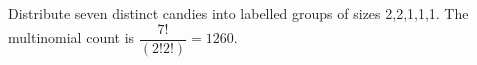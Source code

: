 Distribute seven distinct candies into labelled groups of sizes 2,2,1,1,1. The multinomial count is $\dfrac{7!}{(2!2!)}=\boxed{1260}$.
